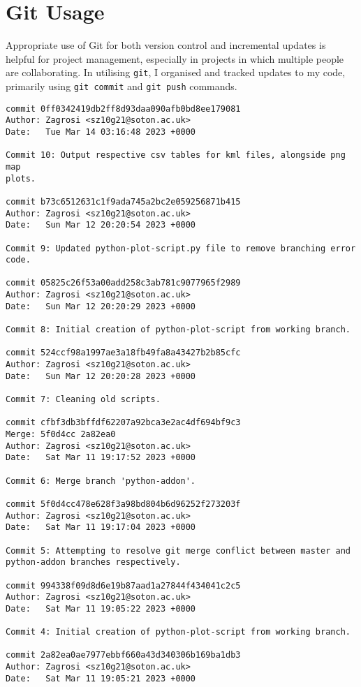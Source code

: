 \documentclass[]{article}
\begin{document}
    \section{Git Usage}

    Appropriate use of Git for both version control and incremental updates is helpful for project management, especially in projects in which multiple people are collaborating. In utilising \verb|git|, I organised and tracked updates to my code, primarily using \verb|git commit| and \verb|git push| commands.

    \begin{verbatim}
commit 0ff0342419db2ff8d93daa090afb0bd8ee179081
Author: Zagrosi <sz10g21@soton.ac.uk>
Date:   Tue Mar 14 03:16:48 2023 +0000

Commit 10: Output respective csv tables for kml files, alongside png map
plots.

commit b73c6512631c1f9ada745a2bc2e059256871b415
Author: Zagrosi <sz10g21@soton.ac.uk>
Date:   Sun Mar 12 20:20:54 2023 +0000

Commit 9: Updated python-plot-script.py file to remove branching error
code.

commit 05825c26f53a00add258c3ab781c9077965f2989
Author: Zagrosi <sz10g21@soton.ac.uk>
Date:   Sun Mar 12 20:20:29 2023 +0000

Commit 8: Initial creation of python-plot-script from working branch.

commit 524ccf98a1997ae3a18fb49fa8a43427b2b85cfc
Author: Zagrosi <sz10g21@soton.ac.uk>
Date:   Sun Mar 12 20:20:28 2023 +0000

Commit 7: Cleaning old scripts.

commit cfbf3db3bffdf62207a92bca3e2ac4df694bf9c3
Merge: 5f0d4cc 2a82ea0
Author: Zagrosi <sz10g21@soton.ac.uk>
Date:   Sat Mar 11 19:17:52 2023 +0000

Commit 6: Merge branch 'python-addon'.

commit 5f0d4cc478e628f3a98bd804b6d96252f273203f
Author: Zagrosi <sz10g21@soton.ac.uk>
Date:   Sat Mar 11 19:17:04 2023 +0000

Commit 5: Attempting to resolve git merge conflict between master and
python-addon branches respectively.

commit 994338f09d8d6e19b87aad1a27844f434041c2c5
Author: Zagrosi <sz10g21@soton.ac.uk>
Date:   Sat Mar 11 19:05:22 2023 +0000

Commit 4: Initial creation of python-plot-script from working branch.

commit 2a82ea0ae7977ebbf660a43d340306b169ba1db3
Author: Zagrosi <sz10g21@soton.ac.uk>
Date:   Sat Mar 11 19:05:21 2023 +0000


\end{verbatim}
\end{document}
